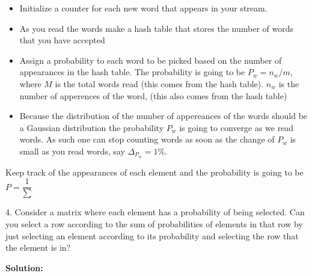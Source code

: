 \documentclass[14pt]{article}
\begin{document}
\begin{itemize}
\item Initialize a counter for each new word that appears in your stream.

\item As you read the words make a hash table that stores the number of
words that you have accepted
\item Assign a probability to each word to be picked based on the number of
appearances in the hash table. The probability is going to be $P_w =
n_w/m$, where $M$ is the total words read (this comes from the hash
table). $n_w$ is the number of apperences of the word, (this also
comes from the hash table)
\item Because the distribution of the number of appereances of the
words should be a Gaussian distribution the probability $P_w$ is going to
converge as we read words. As such one can stop counting words as soon
as the change of $P_w$ is small as you read words, say $\Delta_P_w=1\%$.


\end{itemize}

Keep track of the appearances of each element and the probability is
going to be $P = \dfrac{1}{\sum  }$

\begin{framed}
4. Consider a matrix where each element has a probability of being
selected. Can you select a row according to the sum of probabilities
of elements in that row by just selecting an element according to its
probability and selecting the row that the element is in?
\end{framed}

\textbf{Solution:}\\
\end{document}
